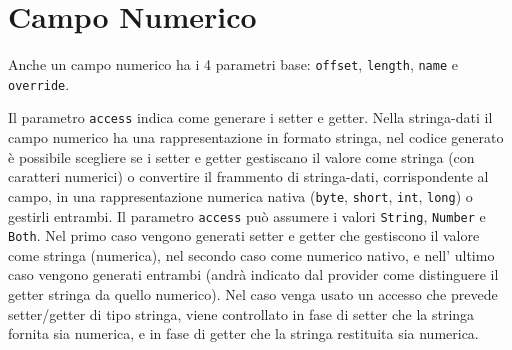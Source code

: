 \section{Campo Numerico}\label{sec:spi.num}
Anche un campo numerico ha i 4 parametri base: \verb!offset!, \verb!length!,
\verb!name! e \verb!override!.

Il parametro \verb!access! indica come generare i setter e getter. 
Nella stringa-dati il campo numerico ha una rappresentazione in formato stringa, 
nel codice generato è possibile scegliere se i setter e getter gestiscano il 
valore come stringa (con caratteri numerici) o convertire il frammento di 
stringa-dati, corrispondente al campo, in una rappresentazione numerica nativa 
(\verb!byte!, \verb!short!, \verb!int!, \verb!long!) o gestirli entrambi.
%
Il parametro \verb!access! può assumere i valori \verb!String!, \verb!Number! e 
\verb!Both!. Nel primo caso vengono generati setter e getter che gestiscono il 
valore come stringa (numerica), nel secondo caso come numerico nativo, e 
nell’ ultimo caso vengono generati entrambi (andrà indicato dal provider come 
distinguere il getter stringa da quello numerico). Nel caso venga usato un 
accesso che prevede setter/getter di tipo stringa, viene controllato in fase di 
setter che la stringa fornita sia numerica, e in fase di getter che la stringa 
restituita sia numerica.


